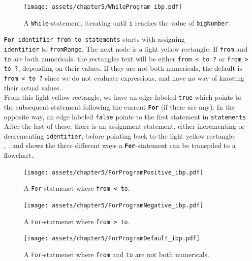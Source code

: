 \begin{figure}[ht]
    \centering
    \texttt{[image: assets/chapter5/WhileProgram\_ibp.pdf]}
    \caption{A \texttt{While}-statement, iterating until \texttt{i} reaches the value of \texttt{bigNumber}.}
    \label{flochartWhile}
\end{figure}

\texttt{\textbf{For} identifier from to statements} starts with assigning \\ \texttt{identifier} to \texttt{fromRange}. The next node is a light yellow rectangle. If \texttt{from} and \texttt{to} are both numericals, the rectangles text will be either \texttt{from < to ?} or \texttt{from > to ?}, depending on their values. If they are not both numericals, the default is \texttt{from < to ?} since we do not evaluate expressions, and have no way of knowing their actual values. \\

From this light yellow rectangle, we have an edge labeled \texttt{true} which points to the subsequent statement following the current \texttt{\textbf{For}} (if there are any). In the opposite way, an edge labeled \texttt{false} points to the first statement in \texttt{statements}. After the last of these, there is an assignment statement, either incrementing or decrementing \texttt{identifier}, before pointing back to the light yellow rectangle. \\

, , and  shows the three different ways a \texttt{\textbf{For}}-statement can be transpiled to a flowchart. \\

\begin{figure}[ht]
    \centering
    \texttt{[image: assets/chapter5/ForProgramPositive\_ibp.pdf]}
    \caption{A \texttt{For}-statmenet where \texttt{from < to}.}
    \label{forExample1}
\end{figure}

\begin{figure}[ht]
    \centering
    \texttt{[image: assets/chapter5/ForProgramNegative\_ibp.pdf]}
    \caption{A \texttt{For}-statmenet where \texttt{from > to}.}
    \label{forExample2}
\end{figure}

\begin{figure}[ht!]
    \centering
    \texttt{[image: assets/chapter5/ForProgramDefault\_ibp.pdf]}
    \caption{A \texttt{For}-statmenet where \texttt{from} and \texttt{to} are not both numericals.}
    \label{forExample3}
\end{figure}

